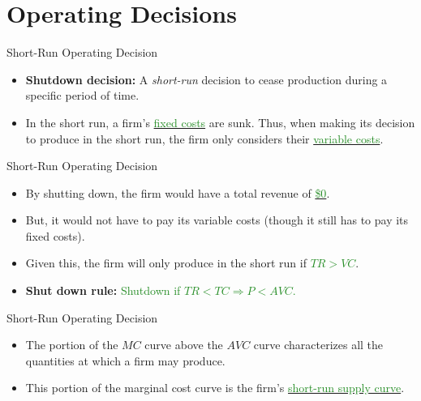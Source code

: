 \documentclass[xcolor={dvipsnames},pdf, hyperref={colorlinks=true, citecolor=ForestGreen, linkcolor=BlueViolet, urlcolor=Magenta}, handout]{beamer}
\newcommand{\defn}[1]{\textbf{#1}}
\newcommand{\ddp}[1]{{\textcolor{ForestGreen}{#1}}}
\newcommand{\dd}[1]{{\underline{\textcolor{ForestGreen}{#1}}}}
\begin{document}
\section{Operating Decisions}

\begin{frame}{Short-Run Operating Decision}
\begin{itemize}
	\item \defn{Shutdown decision:} A \textit{short-run} decision to cease production during a specific period of time.
	\item 	In the short run, a firm's \dd{fixed costs} are sunk. Thus, when making its decision to produce in the short run, the firm only considers their \dd{variable costs}. 
\end{itemize}
\end{frame}

\begin{frame}{Short-Run Operating Decision}
	\begin{itemize}
		\item By shutting down, the firm would have a total revenue of \dd{\$0}. 
		\item But, it would not have to pay its variable costs (though it still has to pay its fixed costs). 
		\item Given this, the firm will only produce in the short run if \dd{$TR>VC$}. 
		\item \defn{Shut down rule:} \ddp{Shutdown if $ TR < TC \Rightarrow P < AVC$.}
		
	\end{itemize}
\end{frame}

\begin{frame}{Short-Run Operating Decision}
\begin{itemize}
	\item 	The portion of the $MC$ curve above the $AVC$ curve characterizes all the quantities at which a firm may produce. 
	\item This portion of the marginal cost curve is the firm's \dd{short-run supply curve}.
	

\end{itemize}
\end{frame}
\end{document}
